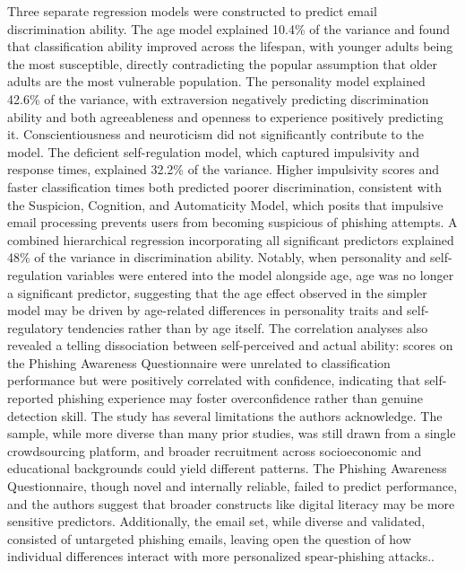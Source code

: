 \documentclass[conference]{IEEEtran}
\begin{document}
Three separate regression models were constructed to predict email discrimination ability. The age model explained 10.4\% of the variance and found that classification ability improved across the lifespan, with younger adults being the most susceptible, directly contradicting the popular assumption that older adults are the most vulnerable population\cite{dawn_m_sarno_which_2023}. The personality model explained 42.6\% of the variance, with extraversion negatively predicting discrimination ability and both agreeableness and openness to experience positively predicting it. Conscientiousness and neuroticism did not significantly contribute to the model\cite{dawn_m_sarno_which_2023}. The deficient self-regulation model, which captured impulsivity and response times, explained 32.2\% of the variance. Higher impulsivity scores and faster classification times both predicted poorer discrimination, consistent with the Suspicion, Cognition, and Automaticity Model, which posits that impulsive email processing prevents users from becoming suspicious of phishing attempts\cite{dawn_m_sarno_which_2023}. 
A combined hierarchical regression incorporating all significant predictors explained 48\% of the variance in discrimination ability. Notably, when personality and self-regulation variables were entered into the model alongside age, age was no longer a significant predictor, suggesting that the age effect observed in the simpler model may be driven by age-related differences in personality traits and self-regulatory tendencies rather than by age itself\cite{dawn_m_sarno_which_2023}. The correlation analyses also revealed a telling dissociation between self-perceived and actual ability: scores on the Phishing Awareness Questionnaire were unrelated to classification performance but were positively correlated with confidence, indicating that self-reported phishing experience may foster overconfidence rather than genuine detection skill\cite{dawn_m_sarno_which_2023}.
The study has several limitations the authors acknowledge. The sample, while more diverse than many prior studies, was still drawn from a single crowdsourcing platform, and broader recruitment across socioeconomic and educational backgrounds could yield different patterns. The Phishing Awareness Questionnaire, though novel and internally reliable, failed to predict performance, and the authors suggest that broader constructs like digital literacy may be more sensitive predictors\cite{dawn_m_sarno_which_2023}. Additionally, the email set, while diverse and validated, consisted of untargeted phishing emails, leaving open the question of how individual differences interact with more personalized spear-phishing attacks.\cite{dawn_m_sarno_which_2023}.
\end{document}

